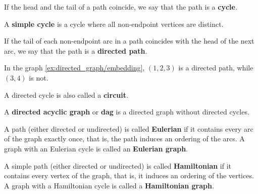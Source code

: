 \begin{definition}
\begin{defenum}
    If the head and the tail of a path coincide, we say that the path is a \textbf{cycle}.

    A \textbf{simple cycle} is a cycle where all non-endpoint vertices are distinct.

    \cite[chapter 1, section 3.2]{Gondran1984} If the tail of each non-endpoint arc in a path coincides with the head of the next arc, we say that the path is a \textbf{directed path}.

    In the graph \cref{ex:directed_graph/embedding}, \( (1, 2, 3) \) is a directed path, while \( (3, 4) \) is not.

    A directed cycle is also called a \textbf{circuit}.

    \cite[231]{Erickson2019} A \textbf{directed acyclic graph} or \textbf{dag} is a directed graph without directed cycles.

    \cite[chapter 8, section 1.1]{Gondran1984} A path (either directed or undirected) is called \textbf{Eulerian} if it contains every arc of the graph exactly once, that is, the path induces an ordering of the arcs. A graph with an Eulerian cycle is called an \textbf{Eulerian graph}.

    \cite[chapter 8, section 3.1]{Gondran1984} A simple path (either directed or undirected) is called \textbf{Hamiltonian} if it contains every vertex of the graph, that is, it induces an ordering of the vertices. A graph with a Hamiltonian cycle is called a \textbf{Hamiltonian graph}.
  \end{defenum}
\end{definition}

